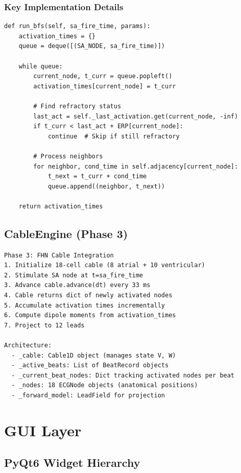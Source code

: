 \documentclass[11pt, a4paper]{article}
\begin{document}
\subsubsection{Key Implementation Details}

\begin{lstlisting}
def run_bfs(self, sa_fire_time, params):
    activation_times = {}
    queue = deque([(SA_NODE, sa_fire_time)])
    
    while queue:
        current_node, t_curr = queue.popleft()
        activation_times[current_node] = t_curr
        
        # Find refractory status
        last_act = self._last_activation.get(current_node, -inf)
        if t_curr < last_act + ERP[current_node]:
            continue  # Skip if still refractory
        
        # Process neighbors
        for neighbor, cond_time in self.adjacency[current_node]:
            t_next = t_curr + cond_time
            queue.append((neighbor, t_next))
    
    return activation_times
\end{lstlisting}

\subsection{CableEngine (Phase 3)}

\begin{verbatim}
Phase 3: FHN Cable Integration
1. Initialize 18-cell cable (8 atrial + 10 ventricular)
2. Stimulate SA node at t=sa_fire_time
3. Advance cable.advance(dt) every 33 ms
4. Cable returns dict of newly activated nodes
5. Accumulate activation times incrementally
6. Compute dipole moments from activation_times
7. Project to 12 leads

Architecture:
  - _cable: Cable1D object (manages state V, W)
  - _active_beats: List of BeatRecord objects
  - _current_beat_nodes: Dict tracking activated nodes per beat
  - _nodes: 18 ECGNode objects (anatomical positions)
  - _forward_model: LeadField for projection
\end{verbatim}

\section{GUI Layer}

\subsection{PyQt6 Widget Hierarchy}
\end{document}
